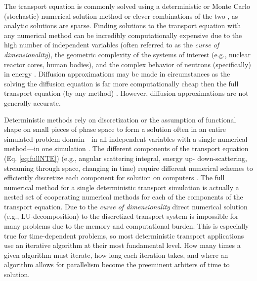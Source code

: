 The transport equation is commonly solved using a deterministic \cite{till_2022_deterministic} or Monte Carlo (stochastic) \cite{lux_1998} numerical solution method or clever combinations of the two \cite{monke_phd, pasmann_phd, kendra_phd}, as analytic solutions are sparse.
Finding solutions to the transport equation with any numerical method can be incredibly computationally expensive due to the high number of independent variables (often referred to as the \textit{curse of dimensionality}), the geometric complexity of the systems of interest (e.g., nuclear reactor cores, human bodies), and the complex behavior of neutrons (specifically) in energy \cite{burke_phd}.
Diffusion approximations may be made in circumstances as the solving the diffusion equation is far more computationally cheap then the full transport equation (by any method) \cite{trahan_phd}.
However, diffusion approximations are not generally accurate.

Deterministic methods rely on discretization or the assumption of functional shape on small pieces of phase space to form a solution often in an entire simulated problem domain---in all independent variables with a single numerical method---in one simulation \cite{till_2022_deterministic}.
The different components of the transport equation (Eq. \eqref{eq:fullNTE}) (e.g., angular scattering integral, energy up- down-scattering, streaming through space, changing in time) require different numerical schemes to efficiently discretize each component for solution on computers \cite{duderstadt_hamilton}.
The full numerical method for a single deterministic transport simulation is actually a nested set of cooperating numerical methods for each of the components of the transport equation.
Due to the \textit{curse of dimensionality} direct numerical solution (e.g., LU-decomposition) to the discretized transport system is impossible for many problems due to the memory and computational burden.
This is especially true for time-dependent problems, so most deterministic transport applications use an iterative algorithm at their most fundamental level.
How many times a given algorithm must iterate, how long each iteration takes, and where an algorithm allows for parallelism become the preeminent arbiters of time to solution.

